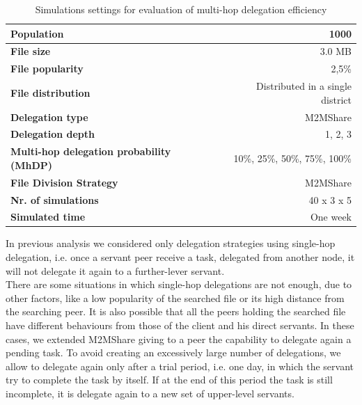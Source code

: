 \begin{table}[h]
\begin{center}
\begin{tabular}{|l|r|}
\hline
\bfseries Population & 1000 \\
\hline
\bfseries File size & 3.0 MB \\
\hline
\bfseries File popularity & 2,5\% \\
\hline
\bfseries File distribution & Distributed in a single district \\
\hline
\bfseries Delegation type & M2MShare\\
\hline
\bfseries Delegation depth & 1, 2, 3 \\
\hline
\bfseries Multi-hop delegation probability (MhDP) & 10\%, 25\%, 50\%, 75\%, 100\% \\
\hline
\bfseries File Division Strategy & M2MShare \\
\hline
\bfseries Nr. of simulations & 40 x 3 x 5\\
\hline
\bfseries Simulated time & One week \\
\hline
\end{tabular}
\end{center}
\caption{Simulations settings for evaluation of multi-hop delegation efficiency\label{tab:settingsMultiHop}}
\end{table}
In previous analysis we considered only delegation strategies using single-hop delegation, i.e. once a servant peer receive a task, delegated from another node, it will not delegate it again to a further-lever servant. 
\\

There are some situations in which single-hop delegations are not enough, due to other factors, like a low popularity of the searched file or its high distance from the searching peer. It is also possible that all the peers holding the searched file have different behaviours from those of the client and his direct servants. In these cases, we extended M2MShare giving to a peer the capability to delegate again a pending task. To avoid creating an excessively large number of delegations, we allow to delegate again only after a trial period, i.e. one day, in which the servant try to complete the task by itself. If at the end of this period the task is still incomplete, it is delegate again to a new set of upper-level servants.
\\

